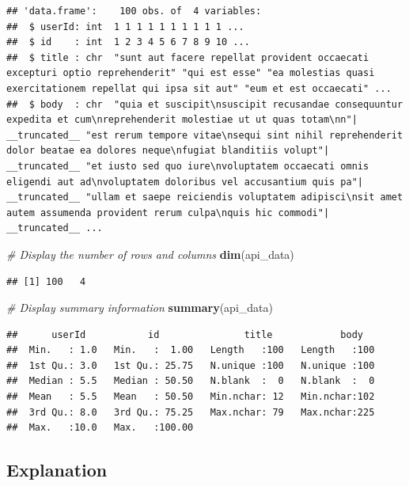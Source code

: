 \documentclass[
]{article}
\newenvironment{Shaded}{\begin{snugshade}}{\end{snugshade}}
\newcommand{\CommentTok}[1]{\textcolor[rgb]{0.56,0.35,0.01}{\textit{#1}}}
\newcommand{\FunctionTok}[1]{\textcolor[rgb]{0.13,0.29,0.53}{\textbf{#1}}}
\newcommand{\NormalTok}[1]{#1}
\begin{document}
\begin{verbatim}
## 'data.frame':    100 obs. of  4 variables:
##  $ userId: int  1 1 1 1 1 1 1 1 1 1 ...
##  $ id    : int  1 2 3 4 5 6 7 8 9 10 ...
##  $ title : chr  "sunt aut facere repellat provident occaecati excepturi optio reprehenderit" "qui est esse" "ea molestias quasi exercitationem repellat qui ipsa sit aut" "eum et est occaecati" ...
##  $ body  : chr  "quia et suscipit\nsuscipit recusandae consequuntur expedita et cum\nreprehenderit molestiae ut ut quas totam\nn"| __truncated__ "est rerum tempore vitae\nsequi sint nihil reprehenderit dolor beatae ea dolores neque\nfugiat blanditiis volupt"| __truncated__ "et iusto sed quo iure\nvoluptatem occaecati omnis eligendi aut ad\nvoluptatem doloribus vel accusantium quis pa"| __truncated__ "ullam et saepe reiciendis voluptatem adipisci\nsit amet autem assumenda provident rerum culpa\nquis hic commodi"| __truncated__ ...
\end{verbatim}

\begin{Shaded}
\begin{Highlighting}[]
\CommentTok{\# Display the number of rows and columns}
\FunctionTok{dim}\NormalTok{(api\_data)}
\end{Highlighting}
\end{Shaded}

\begin{verbatim}
## [1] 100   4
\end{verbatim}

\begin{Shaded}
\begin{Highlighting}[]
\CommentTok{\# Display summary information}
\FunctionTok{summary}\NormalTok{(api\_data)}
\end{Highlighting}
\end{Shaded}

\begin{verbatim}
##      userId           id               title            body    
##  Min.   : 1.0   Min.   :  1.00   Length   :100   Length   :100  
##  1st Qu.: 3.0   1st Qu.: 25.75   N.unique :100   N.unique :100  
##  Median : 5.5   Median : 50.50   N.blank  :  0   N.blank  :  0  
##  Mean   : 5.5   Mean   : 50.50   Min.nchar: 12   Min.nchar:102  
##  3rd Qu.: 8.0   3rd Qu.: 75.25   Max.nchar: 79   Max.nchar:225  
##  Max.   :10.0   Max.   :100.00
\end{verbatim}

\subsection{Explanation}\label{explanation-4}
\end{document}
